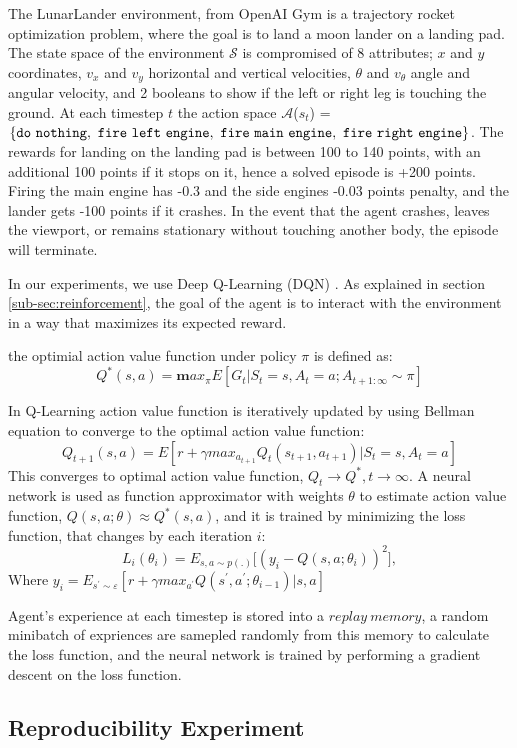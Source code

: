 \documentclass{article}
\newcommand{\cS}{\mathcal{S}}
\newcommand{\cA}{\mathcal{A}}
\begin{document}
The LunarLander environment, from OpenAI Gym \cite[]{brockman2016gym} is a trajectory rocket optimization problem, where the goal is to land a moon lander on a landing pad.
The state space of the environment $\cS$ is compromised of 8 attributes; $x$ and $y$ coordinates, $v_x$ and $v_y$ horizontal and vertical velocities, $\theta$ and $v_\theta$ angle and angular velocity, and 2 booleans to show if the left or right leg is touching the ground. At each timestep $t$ the action space $\cA$($s_t$) = $\tt\{do\ nothing,\ fire\ left\ engine,\ fire\ main\ engine,\ fire\ right\ engine\}$. The rewards for landing on the landing pad is between 100 to 140 points, with an additional 100 points if it stops on it, hence a solved episode is +200 points. Firing the main engine has -0.3 and the side engines -0.03 points penalty, and the lander gets -100 points if it crashes. In the event that the agent crashes, leaves the viewport, or remains stationary without touching another body, the episode will terminate.

In our experiments, we use Deep Q-Learning (DQN) \cite[]{mnih2013playing}. As explained in section \ref{sub-sec:reinforcement}, the goal of the agent is to interact with the environment in a way that maximizes its expected reward.

the optimial action value function under policy $\pi$ is defined as:
$$Q^*(s, a) = \mathbf max_\pi{E}[G_t|S_t =s, A_t=a; A_{t+1: \infty} \sim \pi]$$

In Q-Learning action value function is iteratively updated by using Bellman equation to converge to the optimal action value function:
$$Q_{t+1}(s, a) = E[r + \gamma max_{a_{t+1}} Q_t(s_{t+1}, a_{t+1})|S_t =s, A_t=a]$$
This converges to optimal action value function, $Q_t \rightarrow Q^*, t \rightarrow \infty$. A neural network is used as function approximator with weights $\theta$ to estimate action value function, $Q(s, a; \theta) \approx Q^*(s, a)$, and it is trained by minimizing the loss function, that changes by each iteration $i$:
$$L_i(\theta_i) = E_{s, a\sim p(.)}\big[(y_i - Q(s, a; \theta_i))^2\big],$$
Where $y_i = E_{s^\prime\sim\varepsilon}[r + \gamma max_{a^\prime}Q(s^\prime, a^\prime; \theta_{i-1}) | s, a]$

Agent's experience at each timestep is stored into a $replay\ memory$, a random minibatch of expriences are samepled randomly from this memory to calculate the loss function, and the neural network is trained by performing a gradient descent on the loss function.

\subsection{Reproducibility Experiment} \label{sub-sec:reproduc experiments}
\end{document}
